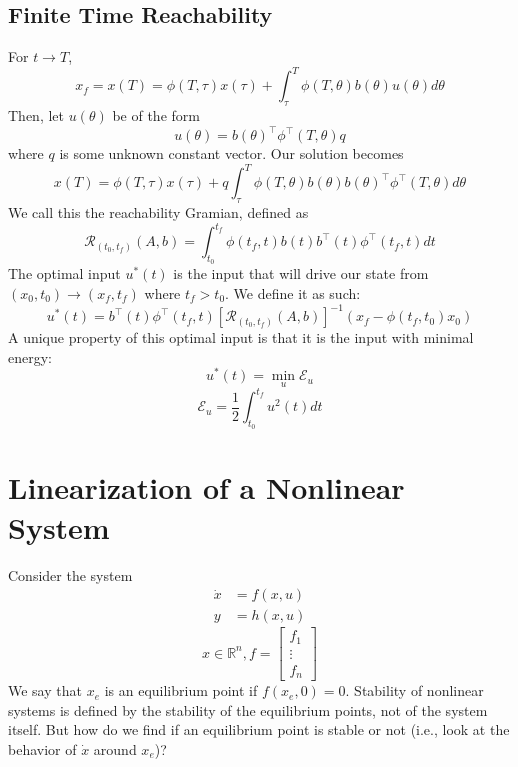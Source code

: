 \documentclass{article}
\begin{document}
\subsection{Finite Time Reachability}

For $t \rightarrow T$,
\[x_f = x(T) = \phi(T, \tau)x(\tau) + \int_{\tau}^{T}\phi(T,\theta)b(\theta)u(\theta)d\theta\]
Then, let $u(\theta)$ be of the form
\[u(\theta) = b(\theta)^\top \phi^\top(T,\theta)q\]
where $q$ is some unknown constant vector. Our solution becomes
\[x(T) = \phi(T, \tau)x(\tau) +
q\int_{\tau}^{T}\phi(T,\theta)b(\theta)b(\theta)^\top\phi^\top(T,\theta)d\theta\]
We call this the reachability Gramian, defined as
\[\mathcal{R}_{(t_0, t_f)}(A,b) = \int_{t_0}^{t_f}\phi(t_f,t)b(t)b^\top(t)\phi^\top(t_f,t)dt\]
The optimal input $u^*(t)$ is the input that will drive our state from $(x_0,t_0) \rightarrow (x_f,t_f)$
where $t_f > t_0$. We define it as such:
\[u^*(t) = b^\top(t)\phi^\top(t_f,t)\left[\mathcal{R}_{(t_0, t_f)}(A,b)\right]^{-1}
(x_f - \phi(t_f,t_0)x_0)\]
A unique property of this optimal input is that it is the input with minimal energy:
\[u^*(t) = \min_{u}\mathcal{E}_u\]
\[\mathcal{E}_u = \frac{1}{2}\int_{t_0}^{t_f}u^2(t)dt\]

\section{Linearization of a Nonlinear System}

Consider the system
\begin{align*}
    \dot{x} &= f(x, u) \\
    y &= h(x, u)
\end{align*}
\[x \in \mathbb{R}^{n}, f = \left[\begin{matrix}
    f_1 \\
    \vdots \\
    f_n
\end{matrix}\right]\]
We say that $x_e$ is an equilibrium point if $f(x_e, 0) = 0$. Stability of nonlinear
systems is defined by the stability of the equilibrium points, not of the system itself. But how
do we find if an equilibrium point is stable or not (i.e., look at the behavior of $\dot{x}$
around $x_e$)?
\end{document}
